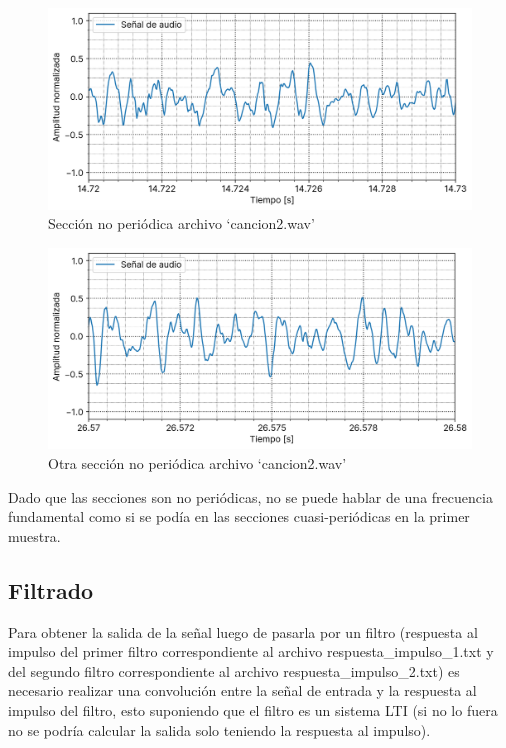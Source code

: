 \documentclass[12pt]{article}
\begin{document}
\begin{figure}
\centering
\includegraphics{plot/cancion2_14_72s_a_14_73s.png}
\caption{Sección no periódica archivo `cancion2.wav'}
\label{cancion2_seccion_no_periodica}
\end{figure}

\begin{figure}
\centering
\includegraphics{plot/cancion2_26_57s_a_26_58s.png}
\caption{Otra sección no periódica archivo `cancion2.wav'}
\label{cancion2_seccion_no_periodica2}
\end{figure}

Dado que las secciones son no periódicas, no se puede hablar de una
frecuencia fundamental como si se podía en las secciones
cuasi-periódicas en la primer muestra.





\hypertarget{filtrado}{%
\subsection{Filtrado}\label{filtrado}}

Para obtener la salida de la señal luego de pasarla por un filtro
(respuesta al impulso del primer filtro correspondiente al archivo
respuesta\_impulso\_1.txt y del segundo filtro correspondiente
al archivo respuesta\_impulso\_2.txt) es necesario realizar una
convolución entre la señal de entrada y la respuesta al impulso del
filtro, esto suponiendo que el filtro es un sistema LTI (si no lo fuera
no se podría calcular la salida solo teniendo la respuesta al impulso).
\end{document}
